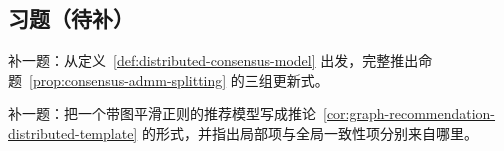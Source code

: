 \subsection*{习题（待补）}

\begin{exercise}[共识 ADMM 占位]
补一题：从定义~\ref{def:distributed-consensus-model} 出发，完整推出命题~\ref{prop:consensus-admm-splitting} 的三组更新式。
\end{exercise}

\begin{exercise}[图推荐桥接题占位]
补一题：把一个带图平滑正则的推荐模型写成推论~\ref{cor:graph-recommendation-distributed-template} 的形式，并指出局部项与全局一致性项分别来自哪里。
\end{exercise}
